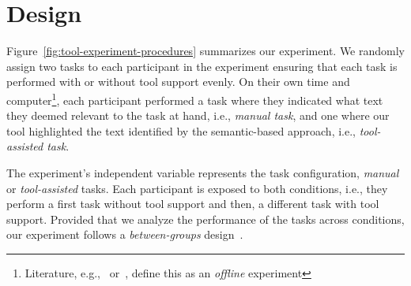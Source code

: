 
\section{Design}
\label{cp6:design}



Figure~\ref{fig:tool-experiment-procedures} summarizes our experiment.
We randomly assign two tasks to each participant in the experiment
ensuring that each task is performed with or without tool support evenly.
On their own time and computer\footnote{Literature, e.g.,~\cite{wohlin2012} or~\cite{DeLucia2012}, define this as an \textit{offline} experiment}, 
each participant performed a task where they indicated 
what text they deemed relevant to the task at hand, i.e., \textit{manual task},
and one where our tool highlighted the text identified by 
the semantic-based approach, i.e., \textit{tool-assisted task}.



The experiment's independent variable represents the task configuration, \textit{manual} or \textit{tool-assisted} tasks. Each participant is exposed to both conditions, i.e., they perform 
a first task without tool support and then, a different task with tool support.
Provided that we analyze the performance of the tasks across conditions, 
our experiment follows a \textit{between-groups} design~\cite{Lazar2017-cp3, wohlin2012}.


















